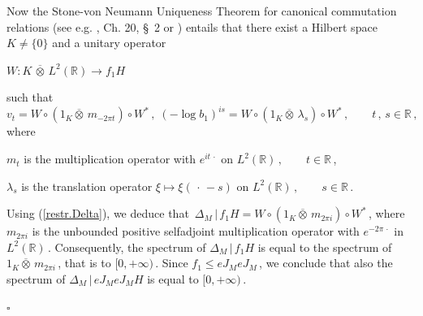 \documentclass[reqno]{amsart}
\theoremstyle{definition}
\theoremstyle{remark}
\numberwithin{equation}{section}
\theoremstyle{plain}
\begin{document}
Now the Stone-von Neumann Uniqueness Theorem for canonical
commutation relations (see e.g. \cite{Ba-Ra}, Ch. 20, \S$\,$ 2 or
\cite{Sl}) entails that there exist a Hilbert space $K\neq\{ 0\}$
and a unitary operator
\smallskip
\begin{center}
$W : K\,\overline{\otimes}\, L^2(\mathbb R )\longrightarrow f_1 H$
\end{center}
\smallskip
such that
\begin{equation*}
v_t =W\circ (1_K\overline{\otimes}\, m_{-2\pi t})\circ W^*\, ,\;
(-\log b_1 )^{is}=W\circ (1_K\overline{\otimes}\,\lambda_s )\circ W^*
\, ,\qquad t\, ,\, s\in\mathbb R\, ,
\end{equation*}
where
\begin{center}
\hspace{2.5 mm}$m_t$ is the multiplication operator with
$e^{it\,\cdot}$ on $L^2(\mathbb R )\, ,\qquad t\in\mathbb R\,$,
\end{center}
\smallskip
\begin{center}
$\lambda_s$ is the translation operator $\xi\longmapsto\xi
(\,\cdot\, -s)$ on $L^2(\mathbb R )\, ,\qquad s\in\mathbb R\,$.
\end{center}
\smallskip
Using (\ref{restr.Delta}), we deduce that $\,\Delta_M\, |\, f_1 H =
W\circ (1_K\overline{\otimes}\, m_{2\pi i})\circ W^*\,$, where
$m_{2\pi i}$ is the unbounded positive selfadjoint multiplication
operator with $e^{-2\pi\,\cdot}$ in $L^2(\mathbb R )\,$.
Consequently, the spectrum of $\Delta_M\, |\, f_1 H$
is equal to the spectrum of $1_K\overline{\otimes}\, m_{2\pi i}\,$,
that is to $[0,+\infty )\,$. Since $f_1\leq eJ_M eJ_M\,$, we
conclude that also the spectrum of $\Delta_M\, |\, eJ_M eJ_M H$
is equal to $[0,+\infty )\,$.

\hfill $\square\quad$
\end{document}
